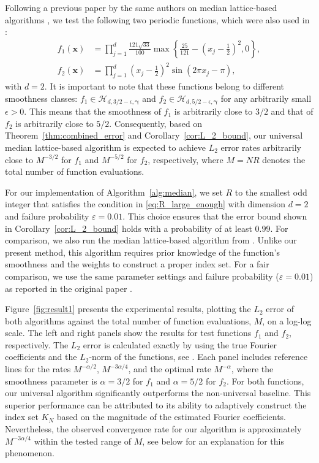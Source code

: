 \documentclass[a4paper,11pt]{article}
\newcommand{\bsx}{\boldsymbol{x}}
\newcommand{\bsgamma}{\boldsymbol{\gamma}}
\newcommand{\Hcal}{\mathcal{H}}
\begin{document}
Following a previous paper by the same authors on median lattice-based algorithms \cite{PKG24}, we test the following two periodic functions, which were also used in \cite{CGK24}:
\begin{align*}
f_1(\bsx) &=  \prod_{j=1}^d \frac{121\sqrt{33}}{100}\max \left\{\frac{25}{121}-\left(x_j-\frac{1}{2} \right)^2, 0 \right \}, \\
f_2(\bsx) &= \prod_{j=1}^{d} \left(x_j-\frac{1}{2} \right)^2\sin(2\pi x_j-\pi),
\end{align*}
with $d=2$. It is important to note that these functions belong to different smoothness classes: $f_1\in \Hcal_{d,3/2-\epsilon,\bsgamma}$ and $f_2\in \Hcal_{d,5/2-\epsilon,\bsgamma}$ for any arbitrarily small $\epsilon>0$.
This means that the smoothness of $f_1$ is arbitrarily close to $3/2$ and that of $f_2$ is arbitrarily close to $5/2$.
Consequently, based on Theorem~\ref{thm:combined_error} and Corollary~\ref{cor:L_2_bound}, our universal median lattice-based algorithm is expected to achieve $L_2$ error rates arbitrarily close to $M^{-3/2}$ for $f_1$ and $M^{-5/2}$ for $f_2$, respectively, where $M=NR$ denotes the total number of function evaluations.

For our implementation of Algorithm~\ref{alg:median}, we set $R$ to the smallest odd integer that satisfies the condition in \eqref{eq:R_large_enough} with dimension $d=2$ and failure probability $\varepsilon=0.01$. This choice ensures that the error bound shown in Corollary~\ref{cor:L_2_bound} holds with a probability of at least $0.99$.
For comparison, we also run the median lattice-based algorithm from \cite{PKG24}. Unlike our present method, this algorithm requires prior knowledge of the function's smoothness and the weights to construct a proper index set. For a fair comparison, we use the same parameter settings and failure probability ($\varepsilon = 0.01$) as reported in the original paper \cite{PKG24}.

Figure~\ref{fig:result1} presents the experimental results, plotting the $L_2$ error of both algorithms against the total number of function evaluations, $M$, on a log-log scale. The left and right panels show the results for test functions $f_1$ and $f_2$, respectively. The $L_2$ error is calculated exactly by using the true Fourier coefficients and the $L_2$-norm of the functions, see \cite{CGK24,PKG24}. Each panel includes reference lines for the rates $M^{-\alpha/2}$, $M^{-3\alpha/4}$, and the optimal rate $M^{-\alpha}$, where the smoothness parameter is $\alpha=3/2$ for $f_1$ and $\alpha=5/2$ for $f_2$. For both functions, our universal algorithm significantly outperforms the non-universal baseline. This superior performance can be attributed to its ability to adaptively construct the index set $K_N$ based on the magnitude of the estimated Fourier coefficients. Nevertheless, the observed convergence rate for our algorithm is approximately $M^{-3\alpha/4}$ within the tested range of $M$, see below for an explanation for this phenomenon.
\end{document}
